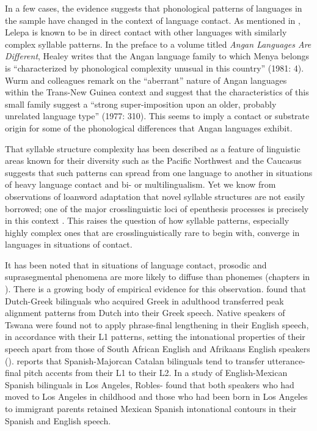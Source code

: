   In a few cases, the evidence suggests that phonological patterns of languages in the sample have changed in the context of language contact. As mentioned in , Lelepa is known to be in direct contact with other languages with similarly complex syllable patterns. In the preface to a volume titled \textit{Angan Languages Are Different}, Healey writes that the Angan language family to which Menya belongs is “characterized by phonological complexity unusual in this country” (1981: 4). Wurm and colleagues remark on the “aberrant” nature of Angan languages within the Trans-New Guinea context and suggest that the characteristics of this small family suggest a “strong super-imposition upon an older, probably unrelated language type” (1977: 310). This seems to imply a contact or substrate origin for some of the phonological differences that Angan languages exhibit.

  That syllable structure complexity has been described as a feature of linguistic areas known for their diversity such as the Pacific Northwest and the Caucasus suggests that such patterns can spread from one language to another in situations of heavy language contact and bi- or multilingualism. Yet we know from observations of loanword adaptation that novel syllable structures are not easily borrowed; one of the major crosslinguistic loci of epenthesis processes is precisely in this context \citep{Hall2011}. This raises the question of how syllable patterns, especially highly complex ones that are crosslinguistically rare to begin with, converge in languages in situations of contact.

  It has been noted that in situations of language contact, prosodic and suprasegmental phenomena are more likely to diffuse than phonemes (chapters in \citealt{AikhenvaldDixon2001b}). There is a growing body of empirical evidence for this observation. \citet{Mennen2004} found that Dutch-Greek bilinguals who acquired Greek in adulthood transferred peak alignment patterns from Dutch into their Greek speech. Native speakers of Tswana were found not to apply phrase-final lengthening in their English speech, in accordance with their L1 patterns, setting the intonational properties of their speech apart from those of South African English and Afrikaans English speakers (\citealt{CoetzeeWissing2007}). \citet{Simonet2011} reports that Spanish-Majorcan Catalan bilinguals tend to transfer utterance-final pitch accents from their L1 to their L2. In a study of English-Mexican Spanish bilinguals in Los Angeles, Robles-\citet{Puente2014} found that both speakers who had moved to Los Angeles in childhood and those who had been born in Los Angeles to immigrant parents retained Mexican Spanish intonational contours in their Spanish and English speech.

